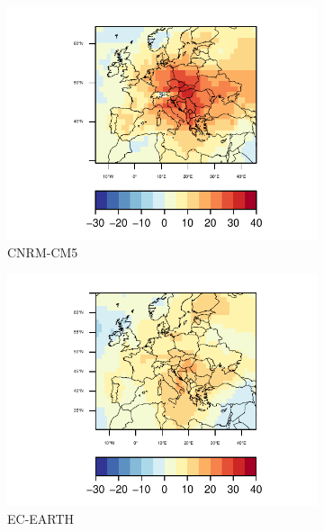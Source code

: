 \begin{figure}[h]
  \centering\begin{subfigure}{0.4\textwidth}
    \includegraphics[width=1.4\textwidth]{figs/capitulo7/CNRM-CM5_ANOMALIAS_JJA_SSR_2050-2021.pdf}
    \caption{CNRM-CM5}
  \end{subfigure}
  \centering\begin{subfigure}{0.4\textwidth}
    \includegraphics[width=1.4\textwidth]{figs/capitulo7/EC-EARTH_ANOMALIAS_JJA_SSR_2050-2021.pdf}\hfill
    \caption{EC-EARTH}
  \end{subfigure}
\hspace{0.1mm}
  \centering\begin{subfigure}{1\textwidth}  

\end{subfigure}
\end{figure}
